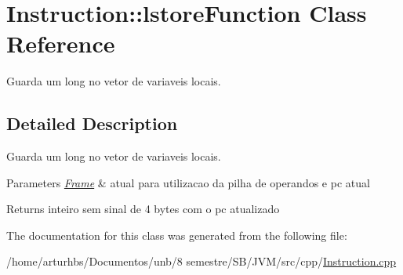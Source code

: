 \hypertarget{classInstruction_1_1lstoreFunction}{}\section{Instruction\+:\+:lstore\+Function Class Reference}
\label{classInstruction_1_1lstoreFunction}


Guarda um long no vetor de variaveis locais.  




\subsection{Detailed Description}
Guarda um long no vetor de variaveis locais. 


\begin{DoxyParams}{Parameters}
{\em \hyperlink{classFrame}{Frame}} & atual para utilizacao da pilha de operandos e pc atual \\
\hline
\end{DoxyParams}
\begin{DoxyReturn}{Returns}
inteiro sem sinal de 4 bytes com o pc atualizado 
\end{DoxyReturn}


The documentation for this class was generated from the following file\+:\begin{DoxyCompactItemize}
\item 
/home/arturhbs/\+Documentos/unb/8 semestre/\+S\+B/\+J\+V\+M/src/cpp/\hyperlink{Instruction_8cpp}{Instruction.\+cpp}\end{DoxyCompactItemize}
